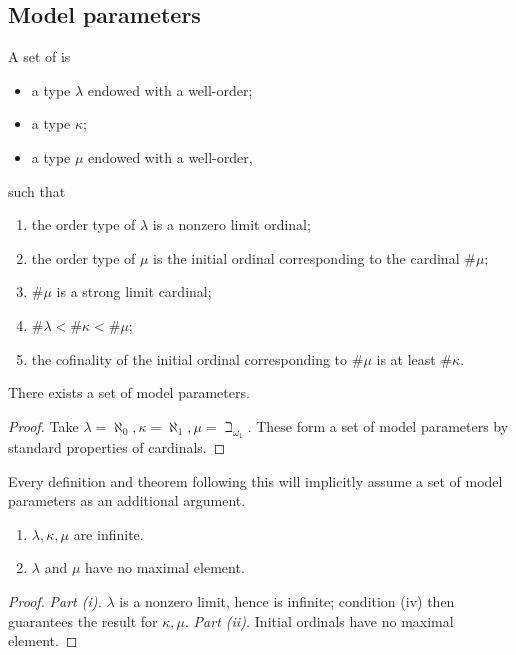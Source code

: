 \subsection{Model parameters}

\begin{definition}
    \label{def:params}
    A set of  is
    \begin{itemize}
        \item a type \( \lambda \) endowed with a well-order;
        \item a type \( \kappa \);
        \item a type \( \mu \) endowed with a well-order,
    \end{itemize}
    such that
    \begin{enumerate}
        \item the order type of \( \lambda \) is a nonzero limit ordinal;
        \item the order type of \( \mu \) is the initial ordinal corresponding to the cardinal \( \#\mu \);
        \item \( \#\mu \) is a strong limit cardinal;
        \item \( \#\lambda < \#\kappa < \#\mu \);
        \item the cofinality of the initial ordinal corresponding to \( \#\mu \) is at least \( \#\kappa \).
    \end{enumerate}
\end{definition}
\begin{lemma}
    There exists a set of model parameters.
\end{lemma}
\begin{proof}
    Take \( \lambda = \aleph_0, \kappa = \aleph_1, \mu = \beth_{\omega_1} \).
    These form a set of model parameters by standard properties of cardinals.
\end{proof}
Every definition and theorem following this will implicitly assume a set of model parameters as an additional argument.
\begin{lemma}
    \label{lem:infinite_no_max_model_params}
    \begin{enumerate}
        \item \( \lambda, \kappa, \mu \) are infinite.
        \item \( \lambda \) and \( \mu \) have no maximal element.
    \end{enumerate}
\end{lemma}
\begin{proof}
    \emph{Part (i).}
    \( \lambda \) is a nonzero limit, hence is infinite; condition (iv) then guarantees the result for \( \kappa, \mu \).
    \emph{Part (ii).}
    Initial ordinals have no maximal element.
\end{proof}
